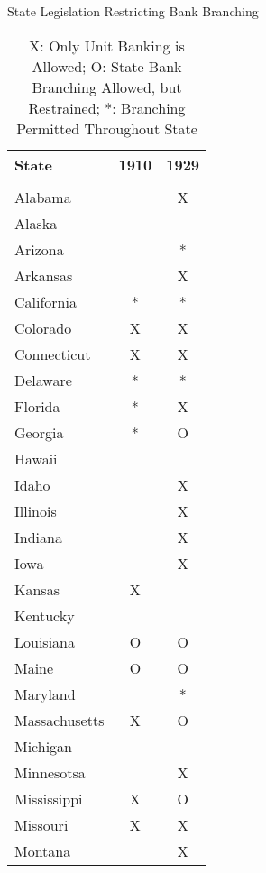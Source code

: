 \documentclass[11pt]{beamer}
\begin{document}
\begin{frame}{State Legislation Restricting Bank Branching}
\begin{table}  \tiny{
\begin{tabular}{lcc}
State &1910 & 1929 \\  
\hline \hline \\
Alabama & & X \\
Alaska & & \\
Arizona & & * \\
Arkansas & & X \\
California & * & * \\
Colorado & X & X \\
Connecticut & X & X \\
Delaware & * & *\\
Florida & * & X \\
Georgia & * & O \\
Hawaii & & \\
Idaho & & X \\
Illinois & & X \\
Indiana & & X \\
Iowa & & X\\
Kansas & X \\
Kentucky & & \\
Louisiana & O & O \\
Maine & O & O \\
Maryland & & * \\
Massachusetts & X & O \\
Michigan &  & \\
Minnesotsa & & X \\
Mississippi & X & O \\
Missouri & X & X \\
Montana &  & X \\ 
\hline                                                                                                                             

\end{tabular}
}
\caption{\tiny{X: Only Unit Banking is Allowed; O: State Bank Branching Allowed, but Restrained; *: Branching Permitted Throughout State}}
\end{table}
\end{frame}


\end{document}
